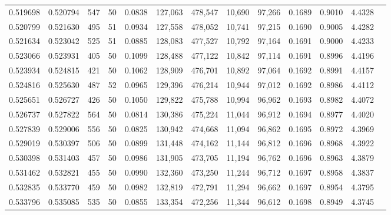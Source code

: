 \begin{tabular}{rrrrrrrrrrrrr}
0.519698 & 0.520794 &   547 &  50 &                                     0.0838 & 127,063 & 478,547 &  10,690 &  97,266 & 0.1689 & 0.9010 & 4.4328 \\
0.520799 & 0.521630 &   495 &  51 &                                     0.0934 & 127,558 & 478,052 &  10,741 &  97,215 & 0.1690 & 0.9005 & 4.4282 \\
0.521634 & 0.523042 &   525 &  51 &                                     0.0885 & 128,083 & 477,527 &  10,792 &  97,164 & 0.1691 & 0.9000 & 4.4233 \\
0.523066 & 0.523931 &   405 &  50 &                                     0.1099 & 128,488 & 477,122 &  10,842 &  97,114 & 0.1691 & 0.8996 & 4.4196 \\
0.523934 & 0.524815 &   421 &  50 &                                     0.1062 & 128,909 & 476,701 &  10,892 &  97,064 & 0.1692 & 0.8991 & 4.4157 \\
0.524816 & 0.525630 &   487 &  52 &                                     0.0965 & 129,396 & 476,214 &  10,944 &  97,012 & 0.1692 & 0.8986 & 4.4112 \\
0.525651 & 0.526727 &   426 &  50 &                                     0.1050 & 129,822 & 475,788 &  10,994 &  96,962 & 0.1693 & 0.8982 & 4.4072 \\
0.526737 & 0.527822 &   564 &  50 &                                     0.0814 & 130,386 & 475,224 &  11,044 &  96,912 & 0.1694 & 0.8977 & 4.4020 \\
0.527839 & 0.529006 &   556 &  50 &                                     0.0825 & 130,942 & 474,668 &  11,094 &  96,862 & 0.1695 & 0.8972 & 4.3969 \\
0.529019 & 0.530397 &   506 &  50 &                                     0.0899 & 131,448 & 474,162 &  11,144 &  96,812 & 0.1696 & 0.8968 & 4.3922 \\
0.530398 & 0.531403 &   457 &  50 &                                     0.0986 & 131,905 & 473,705 &  11,194 &  96,762 & 0.1696 & 0.8963 & 4.3879 \\
0.531462 & 0.532821 &   455 &  50 &                                     0.0990 & 132,360 & 473,250 &  11,244 &  96,712 & 0.1697 & 0.8958 & 4.3837 \\
0.532835 & 0.533770 &   459 &  50 &                                     0.0982 & 132,819 & 472,791 &  11,294 &  96,662 & 0.1697 & 0.8954 & 4.3795 \\
0.533796 & 0.535085 &   535 &  50 &                                     0.0855 & 133,354 & 472,256 &  11,344 &  96,612 & 0.1698 & 0.8949 & 4.3745 \\

\end{tabular}
